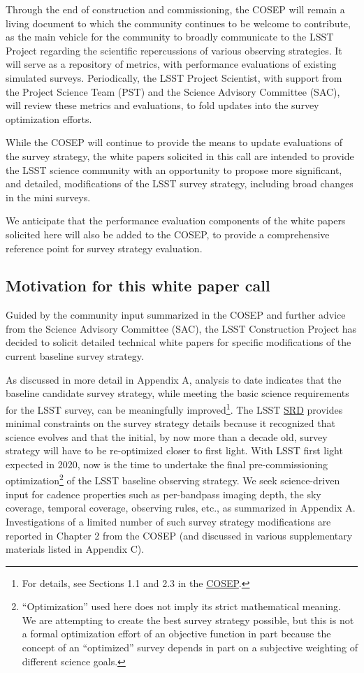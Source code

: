 \documentclass[DM,toc,usenatbib]{lsstdoc}
\begin{document}
Through the end of construction and commissioning, the COSEP will remain a living document 
to which the community continues to be welcome to contribute, as the main vehicle for the 
community to broadly communicate to the LSST Project regarding 
the scientific repercussions of various observing strategies. It will serve as a repository
of metrics, with performance evaluations of existing simulated surveys. Periodically, the LSST
Project Scientist, with support from the Project Science Team (PST) and the Science Advisory Committee (SAC), 
will review these metrics and evaluations, to fold updates into the survey optimization efforts.

While the COSEP will continue to provide the means to update evaluations of the survey strategy, the white 
papers solicited in this call are intended to provide the LSST science community with an opportunity 
to propose more significant, and detailed, modifications of the LSST survey strategy, including broad changes in
the mini surveys.

We anticipate that the performance evaluation components of the white papers solicited here will also 
be added to the COSEP, to provide a comprehensive reference point for survey strategy evaluation. 

\subsection{Motivation for this white paper call}

Guided by the community input summarized in the COSEP and further 
advice from the Science Advisory Committee (SAC), the LSST Construction Project has decided to
solicit detailed technical white papers for specific modifications of the current baseline survey strategy.

As discussed in more detail in Appendix A, analysis to date indicates that the baseline candidate
survey strategy, while meeting the basic science requirements for the LSST survey, can be meaningfully 
improved\footnote{For details, see Sections 1.1 
and 2.3 in the \href{http://ls.st/o5k}{COSEP}.}. The LSST \href{http://ls.st/srd}{SRD}
provides minimal constraints on the survey strategy details because it recognized that science evolves and that the 
initial, by now more than a decade old, survey strategy will have to be re-optimized closer to first 
light. With LSST first light expected in 2020, now is the time to undertake the final pre-commissioning
optimization\footnote{``Optimization'' used here does not imply its strict mathematical meaning. 
We are attempting to create the best survey strategy possible, but this is not a formal optimization 
effort of an objective function in part because the concept of an ``optimized'' survey depends in part on a subjective
weighting of different science goals.} 
of the LSST baseline observing strategy. We seek science-driven input for cadence 
properties such as per-bandpass imaging depth, the sky coverage, temporal coverage, observing
rules, etc., as summarized in Appendix A. Investigations of a limited number of such survey strategy 
modifications are reported in Chapter 2 from the COSEP (and discussed 
in various supplementary materials listed in Appendix C). 
\end{document}

